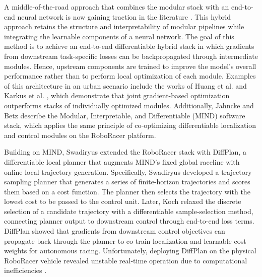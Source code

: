 A middle-of-the-road approach that combines the modular stack with an end-to-end neural network is now gaining traction in the literature \cite{jahncke_MINDStackModularInterpretable_2025, huang_DifferentiableIntegratedMotion_2024, karkus_DiffStackDifferentiableModular_2022, wang_VersatileEfficientReinforcement_2022, swadiryus_DifferentiableMotionPlanning_2025, koch_DifferentiableInterpretablePath_2025}.
This hybrid approach retains the structure and interpretability of modular pipelines while integrating the learnable components of a neural network.
The goal of this method is to achieve an end-to-end differentiable hybrid stack in which gradients from downstream task-specific losses can be backpropagated through intermediate modules.
Hence, upstream components are trained to improve the model's overall performance rather than to perform local optimization of each module.
Examples of this architecture in an urban scenario include the works of Huang et al. \cite{huang_DifferentiableIntegratedMotion_2024} and Karkus et al. \cite{karkus_DiffStackDifferentiableModular_2022}, which demonstrate that joint gradient-based optimization outperforms stacks of individually optimized modules.
Additionally, Jahncke and Betz \cite{jahncke_MINDStackModularInterpretable_2025} describe the Modular, Interpretable, and Differentiable (MIND) software stack, which applies the same principle of co-optimizing differentiable localization and control modules on the RoboRacer platform.

Building on MIND, Swadiryus \cite{swadiryus_DifferentiableMotionPlanning_2025} extended the RoboRacer stack with DiffPlan, a differentiable local planner that augments MIND's fixed global raceline with online local trajectory generation.
Specifically, Swadiryus \cite{swadiryus_DifferentiableMotionPlanning_2025} developed a trajectory-sampling planner that generates a series of finite-horizon trajectories and scores them based on a cost function.
The planner then selects the trajectory with the lowest cost to be passed to the control unit.
Later, Koch \cite{koch_DifferentiableInterpretablePath_2025} relaxed the discrete selection of a candidate trajectory with a differentiable sample-selection method, connecting planner output to downstream control through end-to-end loss terms.
DiffPlan showed that gradients from downstream control objectives can propagate back through the planner to co-train localization and learnable cost weights for autonomous racing.
Unfortunately, deploying DiffPlan on the physical RoboRacer vehicle revealed unstable real-time operation due to computational inefficiencies \cite{koch_DifferentiableInterpretablePath_2025}.

